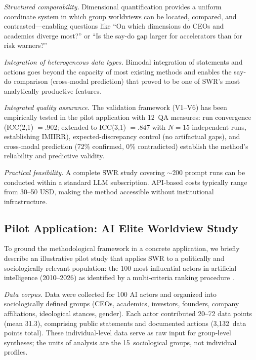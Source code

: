 \documentclass[11pt,a4paper]{article}
\theoremstyle{definition}
\theoremstyle{plain}
\theoremstyle{remark}
\begin{document}
\emph{Structured comparability.} Dimensional quantification provides a uniform coordinate system in which group worldviews can be located, compared, and contrasted---enabling questions like ``On which dimensions do CEOs and academics diverge most?'' or ``Is the say-do gap larger for accelerators than for risk warners?''

\emph{Integration of heterogeneous data types.} Bimodal integration of statements and actions goes beyond the capacity of most existing methods and enables the say-do comparison (cross-modal prediction) that proved to be one of SWR's most analytically productive features.

\emph{Integrated quality assurance.} The validation framework (V1--V6) has been empirically tested in the pilot application with 12~QA measures: run convergence (ICC(2,1) $= .902$; extended to ICC(3,1) $= .847$ with $N = 15$ independent runs, establishing IMIIRR), expected-discrepancy control (no artifactual gaps), and cross-modal prediction (72\% confirmed, 0\% contradicted) establish the method's reliability and predictive validity.

\emph{Practical feasibility.} A complete SWR study covering $\sim$200 prompt runs can be conducted within a standard LLM subscription. API-based costs typically range from 30--50 USD, making the method accessible without institutional infrastructure.


\subsection{Pilot Application: AI Elite Worldview Study}
\label{sec:pilot}

To ground the methodological framework in a concrete application, we briefly describe an illustrative pilot study that applies SWR to a politically and sociologically relevant population: the 100 most influential actors in artificial intelligence (2010--2026) as identified by a multi-criteria ranking procedure \citep{Geiger2026b}.

\emph{Data corpus.} Data were collected for 100 AI actors and organized into sociologically defined groups (CEOs, academics, investors, founders, company affiliations, ideological stances, gender). Each actor contributed 20--72 data points (mean 31.3), comprising public statements and documented actions (3,132~data points total). These individual-level data serve as raw input for group-level syntheses; the units of analysis are the 15~sociological groups, not individual profiles.
\end{document}
